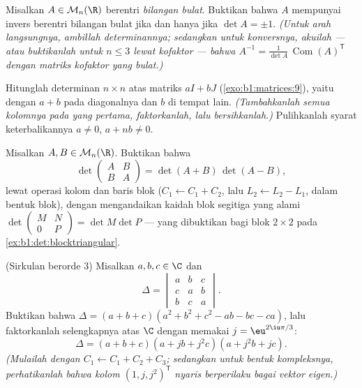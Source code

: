 \begin{exercise}[$\star\star$]\label{exo:b1:det:8}
Misalkan $A \in \mathcal{M}_n(\R)$ berentri \emph{bilangan bulat}. Buktikan
bahwa $A$ mempunyai invers berentri bilangan bulat jika dan hanya jika $\det A
= \pm 1$. \emph{(Untuk arah langsungnya, ambillah determinannya; sedangkan untuk
konversnya, akuilah --- atau buktikanlah untuk $n \leq 3$ lewat kofaktor --- bahwa
$A^{-1} = \frac{1}{\det A}\,\operatorname{Com}(A)^{\mathsf T}$ dengan
matriks kofaktor yang bulat.)}
\end{exercise}

\begin{exercise}[$\star\star\star$]\label{exo:b1:det:9}
Hitunglah determinan $n \times n$ atas matriks $aI + bJ$
(\cref{exo:b1:matrices:9}), yaitu dengan $a + b$ pada diagonalnya dan
$b$ di tempat lain. \emph{(Tambahkanlah semua kolomnya pada yang pertama, faktorkanlah, lalu
bersihkanlah.)} Pulihkanlah syarat keterbalikannya $a \neq 0$, $a + nb
\neq 0$.
\end{exercise}

\begin{exercise}[$\star\star\star$]\label{exo:b1:det:10}
Misalkan $A, B \in \mathcal{M}_n(\R)$. Buktikan bahwa
\[
\det\begin{pmatrix} A & B\\ B & A \end{pmatrix}
= \det(A + B)\,\det(A - B),
\]
lewat operasi kolom dan baris blok ($C_1 \leftarrow C_1 + C_2$, lalu
$L_2 \leftarrow L_2 - L_1$, dalam bentuk blok), dengan mengandaikan kaidah
blok segitiga yang alami $\det\begin{pmatrix} M & N\\ 0 &
P\end{pmatrix} = \det M \det P$ --- yang dibuktikan bagi blok $2 \times 2$
pada \cref{ex:b1:det:blocktriangular}.
\end{exercise}

\begin{exercise}[$\star\star$]\label{exo:b1:det:11}
(Sirkulan berorde $3$) Misalkan $a, b, c \in \C$ dan
\[
\Delta = \begin{vmatrix}
a & b & c\\
c & a & b\\
b & c & a
\end{vmatrix}.
\]
Buktikan bahwa $\Delta = (a + b + c)(a^2 + b^2 + c^2 - ab - bc -
ca)$, lalu faktorkanlah selengkapnya atas $\C$ dengan memakai $j =
\eu^{2\iu\pi/3}$:
\[
\Delta = (a + b + c)(a + jb + j^2c)(a + j^2b + jc) .
\]
\emph{(Mulailah dengan $C_1 \leftarrow C_1 + C_2 + C_3$; sedangkan untuk
bentuk kompleksnya, perhatikanlah bahwa kolom $(1, j, j^2)^{\mathsf T}$
nyaris berperilaku bagai vektor eigen.)}
\end{exercise}

